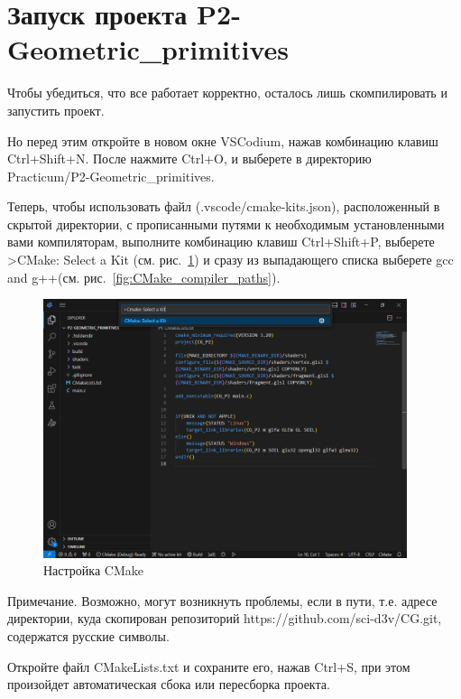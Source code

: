 \documentclass[a4paper,12pt]{article}
\begin{document}
\section{ Запуск проекта \textquotedbl P2-Geometric\_primitives\textquotedbl }

Чтобы убедиться, что все работает корректно, осталось лишь скомпилировать и запустить проект.

Но перед этим откройте в новом окне VSCodium, нажав комбинацию клавиш Ctrl+Shift+N. После нажмите Ctrl+O, и выберете в директорию \\ Practicum/P2-Geometric\_primitives.

Теперь, чтобы использовать файл (.vscode/cmake-kits.json), расположенный в скрытой директории, с прописанными путями к необходимым установленными вами компиляторам,
выполните комбинацию клавиш Ctrl+Shift+P, выберете
\textquotedbl >CMake: Select a Kit\textquotedbl
(см. рис.~\ref{fig:CMake_select_a_Kit}) и сразу из выпадающего списка выберете \textquotedbl gcc and g++\textquotedbl (см. рис.~\ref{fig:CMake_compiler_paths}).



\begin{figure}[H]
	\centering
	\includegraphics[width=0.95\textwidth]{images/CMake_select_a_Kit.png}
	\caption {Настройка CMake}
	\label{fig:CMake_select_a_Kit}
\end{figure}

Примечание.
Возможно, могут возникнуть проблемы, если в пути, т.е. адресе директории, куда скопирован репозиторий https://github.com/sci-d3v/CG.git, содержатся русские символы.

Откройте файл CMakeLists.txt и сохраните его, нажав Ctrl+S, при этом произойдет автоматическая сбока или пересборка проекта.
\end{document}
